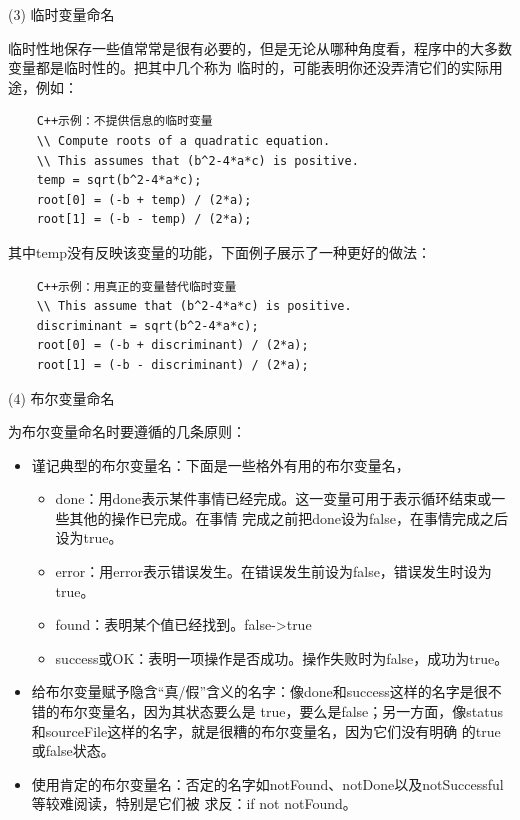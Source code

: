 \documentclass{article}
\begin{document}
\par
(3) 临时变量命名
\par
临时性地保存一些值常常是很有必要的，但是无论从哪种角度看，程序中的大多数变量都是临时性的。把其中几个称为
临时的，可能表明你还没弄清它们的实际用途，例如：
\begin{lstlisting}
    C++示例：不提供信息的临时变量
    \\ Compute roots of a quadratic equation.
    \\ This assumes that (b^2-4*a*c) is positive.
    temp = sqrt(b^2-4*a*c);
    root[0] = (-b + temp) / (2*a);
    root[1] = (-b - temp) / (2*a);
\end{lstlisting}
其中temp没有反映该变量的功能，下面例子展示了一种更好的做法：
\begin{lstlisting}
    C++示例：用真正的变量替代临时变量
    \\ This assume that (b^2-4*a*c) is positive.
    discriminant = sqrt(b^2-4*a*c);
    root[0] = (-b + discriminant) / (2*a);
    root[1] = (-b - discriminant) / (2*a);
\end{lstlisting}

\par
(4) 布尔变量命名
\par
为布尔变量命名时要遵循的几条原则：
\begin{itemize}
    \item 谨记典型的布尔变量名：下面是一些格外有用的布尔变量名，
    \begin{itemize}
        \item done：用done表示某件事情已经完成。这一变量可用于表示循环结束或一些其他的操作已完成。在事情
        完成之前把done设为false，在事情完成之后设为true。
        \item error：用error表示错误发生。在错误发生前设为false，错误发生时设为true。
        \item found：表明某个值已经找到。false->true
        \item success或OK：表明一项操作是否成功。操作失败时为false，成功为true。
    \end{itemize}
    \item 给布尔变量赋予隐含“真/假”含义的名字：像done和success这样的名字是很不错的布尔变量名，因为其状态要么是
    true，要么是false；另一方面，像status和sourceFile这样的名字，就是很糟的布尔变量名，因为它们没有明确
    的true或false状态。
    \item 使用肯定的布尔变量名：否定的名字如notFound、notDone以及notSuccessful等较难阅读，特别是它们被
    求反：if not notFound。
\end{itemize}
\end{document}
